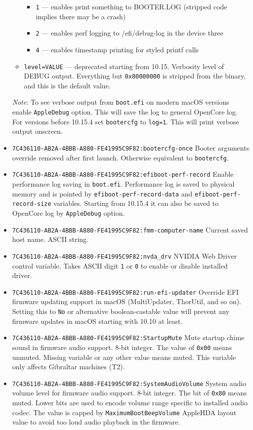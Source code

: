\documentclass[]{article}
\begin{document}
\begin{itemize}
\begin{itemize}
\begin{itemize}
  \item \texttt{1} --- enables print something to BOOTER.LOG (stripped code implies there
  may be a crash)
  \item \texttt{2} --- enables perf logging to /efi/debug-log in the device three
  \item \texttt{4} --- enables timestamp printing for styled printf calls
  \end{itemize}
  \item \texttt{level=VALUE}  --- deprecated starting from 10.15. Verbosity level of
  DEBUG output. Everything but \texttt{0x80000000} is stripped from the binary,
  and this is the default value.
  \end{itemize}

  \emph{Note}: To see verbose output from \texttt{boot.efi} on modern macOS versions
  enable \texttt{AppleDebug} option. This will save the log to general OpenCore log.
  For versions before 10.15.4 set \texttt{bootercfg} to \texttt{log=1}. This will
  print verbose output onscreen.
\item \texttt{7C436110-AB2A-4BBB-A880-FE41995C9F82:bootercfg-once}
  \break
  Booter arguments override removed after first launch. Otherwise equivalent to \texttt{bootercfg}.
\item
  \texttt{7C436110-AB2A-4BBB-A880-FE41995C9F82:efiboot-perf-record}
  \break
  Enable performance log saving in \texttt{boot.efi}. Performance log is saved to physical
  memory and is pointed by \texttt{efiboot-perf-record-data} and \texttt{efiboot-perf-record-size}
  variables. Starting from 10.15.4 it can also be saved to OpenCore log by \texttt{AppleDebug} option.
\item
  \texttt{7C436110-AB2A-4BBB-A880-FE41995C9F82:fmm-computer-name}
  \break
  Current saved host name. ASCII string.
\item
  \texttt{7C436110-AB2A-4BBB-A880-FE41995C9F82:nvda\_drv}
  \break
  NVIDIA Web Driver control variable. Takes ASCII digit \texttt{1} or \texttt{0}
  to enable or disable installed driver.
\item
  \texttt{7C436110-AB2A-4BBB-A880-FE41995C9F82:run-efi-updater}
  \break
  Override EFI firmware updating support in macOS (MultiUpdater, ThorUtil, and so on).
  Setting this to \texttt{No} or alternative boolean-castable value will prevent
  any firmware updates in macOS starting with 10.10 at least.
\item
  \texttt{7C436110-AB2A-4BBB-A880-FE41995C9F82:StartupMute}
  \break
  Mute startup chime sound in firmware audio support. 8-bit integer.
  The value of \texttt{0x00} means unmuted. Missing variable or any
  other value means muted. This variable only affects Gibraltar
  machines (T2).
\item
  \texttt{7C436110-AB2A-4BBB-A880-FE41995C9F82:SystemAudioVolume}
  \break
  System audio volume level for firmware audio support. 8-bit integer.
  The bit of \texttt{0x80} means muted. Lower bits are used to encode
  volume range specific to installed audio codec. The value is capped
  by \texttt{MaximumBootBeepVolume} AppleHDA layout value to avoid
  too loud audio playback in the firmware.
\end{itemize}
\end{document}
